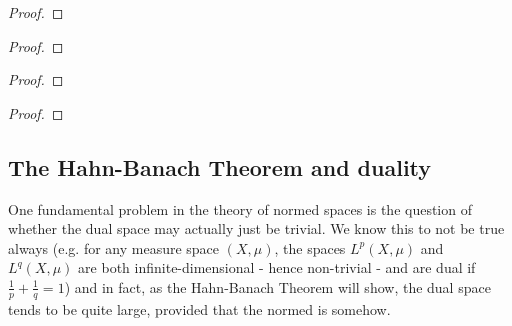         \begin{theorem} \label{theorem: baire_category}
            
        \end{theorem}
            \begin{proof}
                
            \end{proof}

        \begin{theorem}
            
        \end{theorem}
            \begin{proof}
                
            \end{proof}

        \begin{theorem}
            
        \end{theorem}
            \begin{proof}
                
            \end{proof}

        \begin{theorem}
            
        \end{theorem}
            \begin{proof}
                
            \end{proof}

    \subsection{The Hahn-Banach Theorem and duality}
        One fundamental problem in the theory of normed spaces is the question of whether the dual space may actually just be trivial. We know this to not be true always (e.g. for any measure space $(X, \mu)$, the spaces $L^p(X, \mu)$ and $L^q(X, \mu)$ are both infinite-dimensional - hence non-trivial - and are dual if $\frac1p + \frac1q = 1$) and in fact, as the Hahn-Banach Theorem will show, the dual space tends to be quite large, provided that the normed is  somehow.

